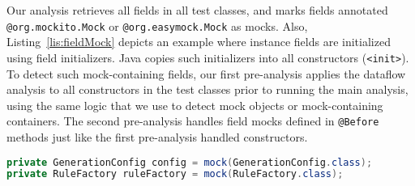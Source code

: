 

Our analysis retrieves all fields in all test classes, and marks fields annotated {\tt @org.mockito.Mock} or {\tt @org.easymock.Mock} as mocks. Also, Listing~\ref{lis:fieldMock} depicts an example where instance fields are initialized using field initializers. Java copies such initializers into all constructors (\texttt{<init>}). To detect such mock-containing fields, our first pre-analysis applies the dataflow analysis to all constructors in the test classes prior to running the main analysis, using the same logic that we use to detect mock objects or mock-containing containers. The second pre-analysis handles field mocks defined in \texttt{@Before} methods just like the first pre-analysis handled constructors.





\begin{lstlisting}[basicstyle=\ttfamily, caption={Field mocks defined by field initializations from \texttt{TypeRuleTest} in jsonschema2pojo.},
basicstyle=\scriptsize\ttfamily,language = Java, framesep=4.5mm,
framexleftmargin=1mm, captionpos=b, label=lis:fieldMock, numbers=none]
private GenerationConfig config = mock(GenerationConfig.class);
private RuleFactory ruleFactory = mock(RuleFactory.class);
\end{lstlisting}

